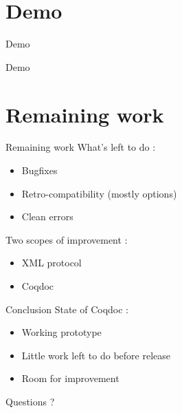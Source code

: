\documentclass[compress]{beamer}
\begin{document}
\section{Demo}
  \begin{frame}{Demo}
    \begin{center}
      Demo
    \end{center}
  \end{frame}

  \section{Remaining work}
  \begin{frame}{Remaining work}
    What's left to do :
    \begin{itemize}
      \item Bugfixes
      \item Retro-compatibility (mostly options)
      \item Clean errors
    \end{itemize}
    Two scopes of improvement :
    \begin{itemize}
      \item XML protocol
      \item Coqdoc
    \end{itemize}
  \end{frame}

  \begin{frame}{Conclusion}
    State of Coqdoc :
    \begin{itemize}
      \item Working prototype
      \item Little work left to do before release
      \item Room for improvement
    \end{itemize}
    \vfill
  \begin{center} \large Questions ? \end{center}
  \end{frame}
\end{document}
